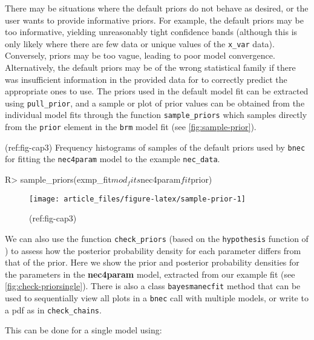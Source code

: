 \documentclass[
]{jss}
\begin{document}
There may be situations where the default  priors do not
behave as desired, or the user wants to provide informative priors. For
example, the default priors may be too informative, yielding
unreasonably tight confidence bands (although this is only likely where
there are few data or unique values of the \texttt{x\_var} data).
Conversely, priors may be too vague, leading to poor model convergence.
Alternatively, the default priors may be of the wrong statistical family
if there was insufficient information in the provided data for
 to correctly predict the appropriate ones to use. The
priors used in the default model fit can be extracted using
\texttt{pull\_prior}, and a sample or plot of prior values can be
obtained from the individual  model fits through the function
\texttt{sample\_priors} which samples directly from the \texttt{prior}
element in the \texttt{brm} model fit (see \autoref{fig:sample-prior}).

(ref:fig-cap3) Frequency histograms of samples of the default priors
used by \texttt{bnec} for fitting the \texttt{nec4param} model to the
example \texttt{nec\_data}.

\begin{CodeChunk}
\begin{CodeInput}
R> sample_priors(exmp_fit$mod_fits$nec4param$fit$prior)
\end{CodeInput}
\begin{figure}

{\centering \texttt{[image: article\_files/figure-latex/sample-prior-1]} 

}

\caption[(ref:fig-cap3)]{(ref:fig-cap3)}\label{fig:sample-prior}
\end{figure}
\end{CodeChunk}

We can also use the function \texttt{check\_priors} (based on the
\texttt{hypothesis} function of ) to assess how the posterior
probability density for each parameter differs from that of the prior.
Here we show the prior and posterior probability densities for the
parameters in the \textbf{nec4param} model, extracted from our example
fit (see \autoref{fig:check-priorsingle}). There is also a class
\texttt{bayesmanecfit} method that can be used to sequentially view all
plots in a \texttt{bnec} call with multiple models, or write to a pdf as
in \texttt{check\_chains}.

This can be done for a single model using:
\end{document}
